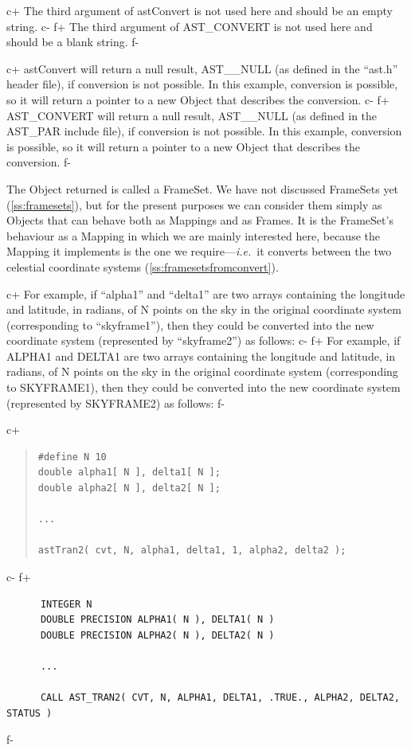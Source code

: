 \documentclass[twoside,11pt]{article}
\newcommand{\secref}[1]{\S\ref{#1}}
\renewcommand{\secref}[1]{\ref{#1}}
\begin{document}
c+
The third argument of astConvert is not used here and should be an
empty string.
c-
f+
The third argument of AST\_CONVERT is not used here and should be a
blank string.
f-

c+
astConvert will return a null result, AST\_\_NULL (as defined in the
``ast.h'' header file), if conversion is not possible. In this
example, conversion is possible, so it will return a pointer to a new
Object that describes the conversion.
c-
f+
AST\_CONVERT will return a null result, AST\_\_NULL (as defined in the
AST\_PAR include file), if conversion is not possible. In this
example, conversion is possible, so it will return a pointer to a new
Object that describes the conversion.
f-

The Object returned is called a FrameSet. We have not discussed
FrameSets yet (\secref{ss:framesets}), but for the present purposes we
can consider them simply as Objects that can behave both as Mappings
and as Frames. It is the FrameSet's behaviour as a Mapping in which we
are mainly interested here, because the Mapping it implements is the
one we require---{\em{i.e.}}\ it converts between the two celestial
coordinate systems (\secref{ss:framesetsfromconvert}).

c+
For example, if ``alpha1'' and ``delta1'' are two arrays containing
the longitude and latitude, in radians, of N points on the sky in the
original coordinate system (corresponding to ``skyframe1''), then they
could be converted into the new coordinate system (represented by
``skyframe2'') as follows:
c-
f+
For example, if ALPHA1 and DELTA1 are two arrays containing the
longitude and latitude, in radians, of N points on the sky in the
original coordinate system (corresponding to SKYFRAME1), then they
could be converted into the new coordinate system (represented by
SKYFRAME2) as follows:
f-

c+
\begin{quote}
\small
\begin{verbatim}
#define N 10
double alpha1[ N ], delta1[ N ];
double alpha2[ N ], delta2[ N ];

...

astTran2( cvt, N, alpha1, delta1, 1, alpha2, delta2 );
\end{verbatim}
\normalsize
\end{quote}
c-
f+
\small
\begin{verbatim}
      INTEGER N
      DOUBLE PRECISION ALPHA1( N ), DELTA1( N )
      DOUBLE PRECISION ALPHA2( N ), DELTA2( N )

      ...

      CALL AST_TRAN2( CVT, N, ALPHA1, DELTA1, .TRUE., ALPHA2, DELTA2, STATUS )
\end{verbatim}
\normalsize
f-
\end{document}
